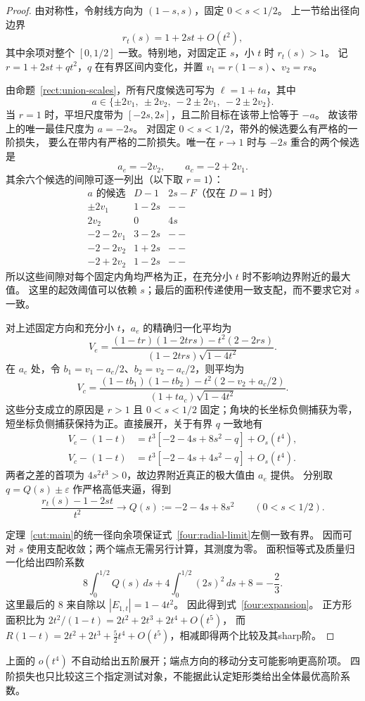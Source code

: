 \begin{proof}
由对称性，令射线方向为 $(1-s,s)$，固定 $0<s<1/2$。
上一节给出径向边界
\[
 r_t(s)=1+2st+O(t^2),
\]
其中余项对整个 $[0,1/2]$ 一致。特别地，对固定正 $s$，小 $t$ 时 $r_t(s)>1$。
记 $r=1+2st+qt^2$，$q$ 在有界区间内变化，并置
$v_1=r(1-s)$、$v_2=rs$。

由命题~\ref{rect:union-scales}，所有尺度候选可写为 $\ell=1+ta$，其中
\[
 a\in\{\pm2v_1,\ \pm2v_2,\ -2\pm2v_1,\ -2\pm2v_2\}.
\]
当 $r=1$ 时，平坦尺度带为 $[-2s,2s]$，且二阶目标在该带上恰等于 $-a$。
故该带上的唯一最佳尺度为 $a=-2s$。
对固定 $0<s<1/2$，带外的候选要么有严格的一阶损失，
要么在带内有严格的二阶损失。唯一在 $r\to1$ 时与 $-2s$ 重合的两个候选是
\[
 a_e=-2v_2,\qquad a_c=-2+2v_1.
\]
其余六个候选的间隙可逐一列出（以下取 $r=1$）：
\[
\begin{array}{c|c|c}
 a\text{ 的候选}&D-1&2s-F\text{（仅在 }D=1\text{ 时）}\\\hline
 \pm2v_1&1-2s&--\\
 2v_2&0&4s\\
 -2-2v_1&3-2s&--\\
 -2-2v_2&1+2s&--\\
 -2+2v_2&1-2s&--
\end{array}
\]
所以这些间隙对每个固定内角均严格为正，在充分小 $t$ 时不影响边界附近的最大值。
这里的起效阈值可以依赖 $s$；最后的面积传递使用一致支配，而不要求它对 $s$ 一致。

对上述固定方向和充分小 $t$，$a_e$ 的精确归一化平均为
\[
 V_e=\frac{(1-tr)(1-2trs)-t^2(2-2rs)}{(1-2trs)\sqrt{1-4t^2}}.
\]
在 $a_c$ 处，令 $b_1=v_1-a_c/2$、$b_2=v_2-a_c/2$，则平均为
\[
 V_c=\frac{(1-tb_1)(1-tb_2)-t^2(2-v_2+a_c/2)}
 {(1+ta_c)\sqrt{1-4t^2}}.
\]
这些分支成立的原因是 $r>1$ 且 $0<s<1/2$ 固定；角块的长坐标负侧捕获为零，
短坐标负侧捕获保持为正。直接展开，关于有界 $q$ 一致地有
\begin{align*}
 V_e-(1-t)&=t^3[-2-4s+8s^2-q]+O_s(t^4),\\
 V_c-(1-t)&=t^3[-2-4s+4s^2-q]+O_s(t^4).
\end{align*}
两者之差的首项为 $4s^2t^3>0$，故边界附近真正的极大值由 $a_e$ 提供。
分别取 $q=Q(s)\pm\varepsilon$ 作严格高低夹逼，得到
\begin{equation}\label{four:radial-limit}
 \frac{r_t(s)-1-2st}{t^2}\longrightarrow
 Q(s):=-2-4s+8s^2\qquad(0<s<1/2).
\end{equation}

定理~\ref{cut:main}的统一径向余项保证式~\eqref{four:radial-limit}左侧一致有界。
因而可对 $s$ 使用支配收敛；两个端点无需另行计算，其测度为零。
面积恒等式及质量归一化给出四阶系数
\[
 8\int_0^{1/2}Q(s)\,ds+
 4\int_0^{1/2}(2s)^2\,ds+8
 =-\frac23.
\]
这里最后的 $8$ 来自除以 $|E_{1,t}|=1-4t^2$。
因此得到式~\eqref{four:expansion}。
正方形面积比为 $2t^2/(1-t)=2t^2+2t^3+2t^4+O(t^5)$，
而 $R(1-t)=2t^2+2t^3+\frac52t^4+O(t^5)$，相减即得两个比较及其sharp阶。
\end{proof}

\begin{remark}\label{four:scope}
上面的 $o(t^4)$ 不自动给出五阶展开；端点方向的移动分支可能影响更高阶项。
四阶损失也只比较这三个指定测试对象，不能据此认定矩形类给出全体最优高阶系数。
\end{remark}
